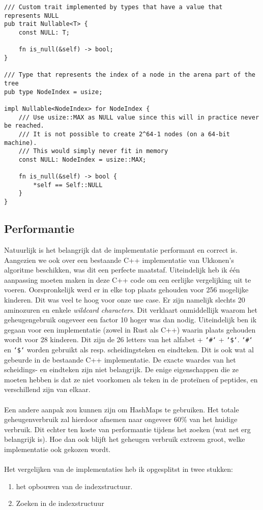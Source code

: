 \begin{verbatim}
/// Custom trait implemented by types that have a value that represents NULL
pub trait Nullable<T> {
    const NULL: T;

    fn is_null(&self) -> bool;
}

/// Type that represents the index of a node in the arena part of the tree
pub type NodeIndex = usize;

impl Nullable<NodeIndex> for NodeIndex {
    /// Use usize::MAX as NULL value since this will in practice never be reached.
    /// It is not possible to create 2^64-1 nodes (on a 64-bit machine).
    /// This would simply never fit in memory
    const NULL: NodeIndex = usize::MAX;

    fn is_null(&self) -> bool {
        *self == Self::NULL
    }
}
\end{verbatim}

\subsection{Performantie}\label{subsec:performantie}
Natuurlijk is het belangrijk dat de implementatie performant en correct is.
Aangezien we ook over een bestaande C++ implementatie van Ukkonen's algoritme beschikken, was dit een perfecte maatstaf.
Uiteindelijk heb ik één aanpassing moeten maken in deze C++ code om een eerlijke vergelijking uit te voeren.
Oorspronkelijk werd er in elke top plaats gehouden voor 256 mogelijke kinderen.
Dit was veel te hoog voor onze use case.
Er zijn namelijk slechts 20 aminozuren en enkele \textit{wildcard characters}.
Dit verklaart onmiddellijk waarom het geheugengebruik ongeveer een factor 10 hoger was dan nodig.
Uiteindelijk ben ik gegaan voor een implementatie (zowel in Rust als C++) waarin plaats gehouden wordt voor 28 kinderen.
Dit zijn de 26 letters van het alfabet + \texttt{`\#`} + \texttt{`\$`}.
\texttt{`\#`} en \texttt{`\$`} worden gebruikt als resp. scheidingsteken en eindteken.
Dit is ook wat al gebeurde in de bestaande C++ implementatie.
De exacte waardes van het scheidings- en eindteken zijn niet belangrijk.
De enige eigenschappen die ze moeten hebben is dat ze niet voorkomen als teken in de proteïnen of peptides, en verschillend zijn van elkaar.
\\ \\
Een andere aanpak zou kunnen zijn om HashMaps te gebruiken.
Het totale geheugenverbruik zal hierdoor afnemen naar ongeveer 60\% van het huidige verbruik.
Dit echter ten koste van performantie tijdens het zoeken (wat net erg belangrijk is).
Hoe dan ook blijft het geheugen verbruik extreem groot, welke implementatie ook gekozen wordt.
\\ \\
Het vergelijken van de implementaties heb ik opgesplitst in twee stukken:
\begin{enumerate}
    \item het opbouwen van de indexstructuur.
    \item Zoeken in de indexstructuur
\end{enumerate}

